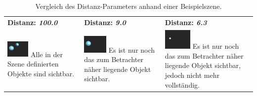 \begin{table}[H]
    \centering
    \caption{Vergleich des Distanz-Parameters anhand einer Beispielszene.}\label{table:sphere_tracing_distance}
    \begin{tabular}{p{}p{}p{}}
        \toprule
            \textbf{Distanz: \textit{100.0}} &
            \textbf{Distanz: \textit{9.0}}   &
            \textbf{Distanz: \textit{6.3}}   \\
        \cmidrule(r){1-1}\cmidrule(lr){2-2}\cmidrule(l){3-3}
            \includegraphics[width=0.3\textwidth]{img/sphere_tracing_distance_full.png}
            \newline
            Alle in der Szene definierten Objekte sind sichtbar. &
            \includegraphics[width=0.3\textwidth]{img/sphere_tracing_distance_less.png} \newline
            Es ist nur noch das zum Betrachter näher liegende Objekt sichtbar. &
            \includegraphics[width=0.3\textwidth]{img/sphere_tracing_distance_min.png} \newline
            Es ist nur noch das zum Betrachter näher liegende Objekt
            sichtbar, jedoch nicht mehr vollständig. \\
        \bottomrule
    \end{tabular}
\end{table}

